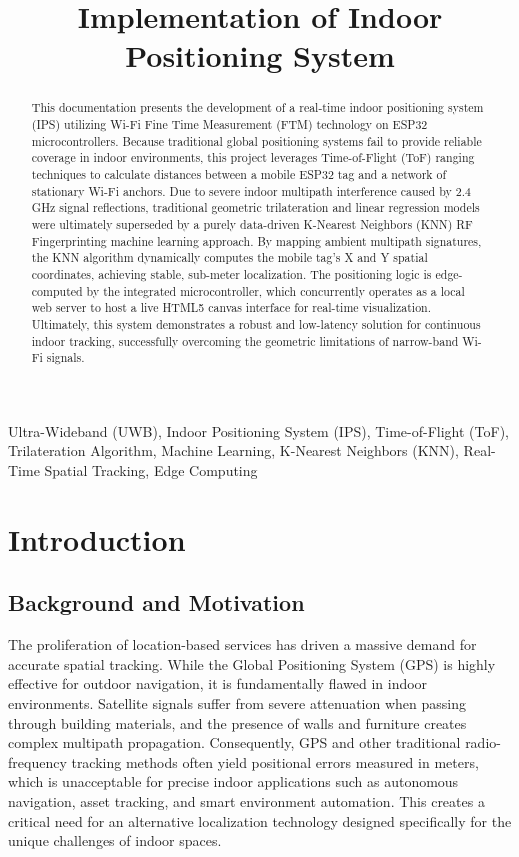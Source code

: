 \documentclass[conference]{IEEEtran}
\title{Implementation of Indoor Positioning System}
\author{
\IEEEauthorblockN{Indhiresh S, Kavin B}
\IEEEauthorblockA{
Department of Electrical Engineering\\
IIT Hyderabad\\
Email: ee25btech11027@iith.ac.in, ee25btech11033@iith.ac.in}
}
\begin{document}
\maketitle
\begin{abstract}
This documentation presents the development of a real-time indoor positioning system (IPS) utilizing Wi-Fi Fine Time Measurement (FTM) technology on ESP32 microcontrollers. Because traditional global positioning systems fail to provide reliable coverage in indoor environments, this project leverages Time-of-Flight (ToF) ranging techniques to calculate distances between a mobile ESP32 tag and a network of stationary Wi-Fi anchors. Due to severe indoor multipath interference caused by 2.4 GHz signal reflections, traditional geometric trilateration and linear regression models were ultimately superseded by a purely data-driven K-Nearest Neighbors (KNN) RF Fingerprinting machine learning approach. By mapping ambient multipath signatures, the KNN algorithm dynamically computes the mobile tag's X and Y spatial coordinates, achieving stable, sub-meter localization. The positioning logic is edge-computed by the integrated microcontroller, which concurrently operates as a local web server to host a live HTML5 canvas interface for real-time visualization. Ultimately, this system demonstrates a robust and low-latency solution for continuous indoor tracking, successfully overcoming the geometric limitations of narrow-band Wi-Fi signals.
\end{abstract}

\begin{IEEEkeywords}
Ultra-Wideband (UWB), Indoor Positioning System (IPS), Time-of-Flight (ToF), Trilateration Algorithm, Machine Learning, K-Nearest Neighbors (KNN), Real-Time Spatial Tracking, Edge Computing
\end{IEEEkeywords}

\section{Introduction}

\subsection{Background and Motivation}
The proliferation of location-based services has driven a massive demand for accurate spatial tracking. While the Global Positioning System (GPS) is highly effective for outdoor navigation, it is fundamentally flawed in indoor environments. Satellite signals suffer from severe attenuation when passing through building materials, and the presence of walls and furniture creates complex multipath propagation. Consequently, GPS and other traditional radio-frequency tracking methods often yield positional errors measured in meters, which is unacceptable for precise indoor applications such as autonomous navigation, asset tracking, and smart environment automation. This creates a critical need for an alternative localization technology designed specifically for the unique challenges of indoor spaces.
\end{document}
